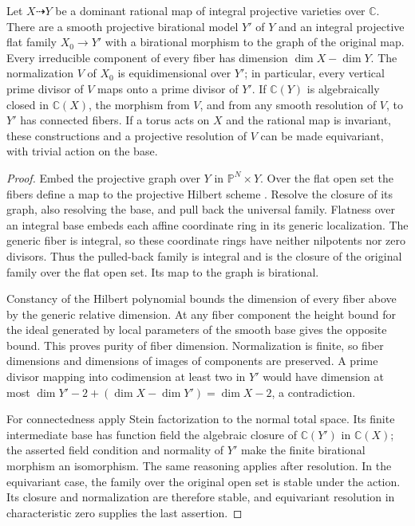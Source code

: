 \begin{lemma}\label{V:flat-model}
Let $X\dashrightarrow Y$ be a dominant rational map of integral projective
varieties over $\mathbb C$.  There are a smooth projective birational model
$Y'$ of $Y$ and an integral projective flat family $X_0\to Y'$ with a
birational morphism to the graph of the original map.  Every irreducible
component of every fiber has dimension $\dim X-\dim Y$.  The normalization
$V$ of $X_0$ is equidimensional over $Y'$; in particular, every vertical
prime divisor of $V$ maps onto a prime divisor of $Y'$.  If
$\mathbb C(Y)$ is algebraically closed in $\mathbb C(X)$, the morphism
from $V$, and from any smooth resolution of $V$, to $Y'$ has connected
fibers.  If a torus acts on $X$ and the rational map is invariant, these
constructions and a projective resolution of $V$ can be made equivariant,
with trivial action on the base.
\end{lemma}

\begin{proof}
Embed the projective graph over $Y$ in $\mathbb P^N\times Y$.
Over the flat open set the fibers define a map to the projective
Hilbert scheme \cite[Theorem~3.2 and the Hilbert-scheme specialization
after Proposition~3.8]{Grothendieck1961Hilbert}.
Resolve the closure of its graph, also resolving the base, and pull back the
universal family.  Flatness over an integral base embeds each affine
coordinate ring in its generic localization.  The generic fiber is
integral, so these coordinate rings have neither nilpotents nor zero
divisors.  Thus the pulled-back family is integral and is the closure of
the original family over the flat open set.  Its map to the graph is
birational.

Constancy of the Hilbert polynomial bounds the dimension of every fiber
above by the generic relative dimension.  At any fiber component the
height bound for the ideal generated by local parameters of the smooth
base gives the opposite bound.  This proves purity of fiber dimension.
Normalization is finite, so fiber dimensions and dimensions of images of
components are preserved.  A prime divisor mapping into codimension at
least two in $Y'$ would have dimension at most
$\dim Y'-2+(\dim X-\dim Y')=\dim X-2$, a contradiction.

For connectedness apply Stein factorization to the normal total space.
Its finite intermediate base has function field the algebraic closure
of $\mathbb C(Y')$ in $\mathbb C(X)$; the asserted field condition and
normality of $Y'$ make the finite birational morphism an isomorphism.
The same reasoning applies after resolution.  In the equivariant case,
the family over the original open set is stable under the action.
Its closure and normalization are therefore stable, and equivariant
resolution in characteristic zero supplies the last assertion.
\end{proof}

